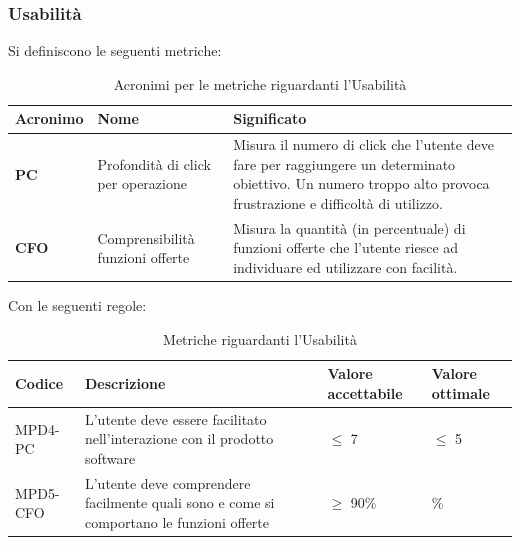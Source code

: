 \subsubsection{Usabilità}
\par Si definiscono le seguenti metriche:
\begin{table}[h!]
\centering
\def\arraystretch{1.5}
\begin{tabular}{ |m{2cm}|m{5.5cm}|m{6.5cm}| }
\hline
\rowcolor{lightgray!30}
\textbf{Acronimo} & \textbf{Nome} & \textbf{Significato}\\
\hline
\textbf{PC} & Profondità di click per operazione & Misura il numero di click che l'utente deve fare per raggiungere un determinato obiettivo. Un numero troppo alto provoca frustrazione e difficoltà di utilizzo.\\
\hline
\textbf{CFO} & Comprensibilità funzioni offerte & Misura la quantità (in percentuale) di funzioni offerte che l'utente riesce ad individuare ed utilizzare con facilità.\\
\hline
\end{tabular}
\caption{Acronimi per le metriche riguardanti l'Usabilità}
\end{table}
\newpage
\par Con le seguenti regole:
\begin{table}[h!]
\centering
\def\arraystretch{1.5}
\begin{tabular}{ |>{\centering\arraybackslash}m{2.5cm}|>{\centering\arraybackslash}m{5.5cm}|>{\centering\arraybackslash}m{3cm}|>{\centering\arraybackslash}m{3cm}| }
\hline
\rowcolor{black}
\textbf{\color{white} Codice} & \textbf{\color{white} Descrizione} & \textbf{\color{white} Valore accettabile} & \textbf{\color{white} Valore ottimale}\\
\hline
MPD4-PC & L'utente deve essere facilitato nell'interazione con il prodotto software & $\leq$ 7 & $\leq$ 5 \\
\hline
MPD5-CFO & L'utente deve comprendere facilmente quali sono e come si comportano le funzioni offerte & $\geq$ 90\% & 100\% \\
\hline
\end{tabular}
\caption{Metriche riguardanti l'Usabilità}
\end{table}

